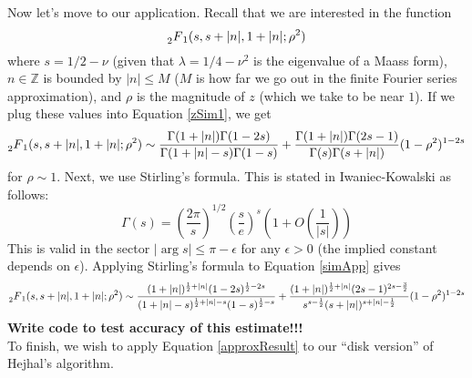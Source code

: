 \documentclass[]{article}
\begin{document}
Now let's move to our application.
Recall that we are interested in the function
$$
\prescript{}{2}{F}_1(s, s + |n|, 1 + |n|; \rho^2)
$$
where $s = 1/2 - \nu$ (given that $\lambda = 1/4 - \nu^2$ is the eigenvalue of a Maass form), $n \in \mathbb{Z}$ is bounded by $|n| \leq M$ ($M$ is how far we go out in the finite Fourier series approximation), and $\rho$ is the magnitude of $z$ (which we take to be near $1$).
If we plug these values into Equation \ref{zSim1}, we get
\begin{equation}\label{simApp}
\prescript{}{2}{F}_1(s, s + |n|, 1 + |n|; \rho^2) \sim
\frac{\Gamma(1 + |n|)\Gamma(1 - 2s)}{\Gamma(1 + |n| - s)\Gamma(1 - s)} +
\frac{\Gamma(1 + |n|)\Gamma(2s-1)}{\Gamma(s)\Gamma(s + |n|)}(1 - \rho^2)^{1 - 2s}
\end{equation}
for $\rho \sim 1$.
Next, we use Stirling's formula.
This is stated in Iwaniec-Kowalski as follows:
$$
\Gamma(s) = \left( \frac{2\pi}{s} \right)^{1/2}\left( \frac{s}{e} \right)^s\left( 1 + O\left( \frac{1}{|s|}\right) \right)
$$
This is valid in the sector $|\arg s| \leq \pi - \epsilon$ for any $\epsilon > 0$ (the implied constant depends on $\epsilon$).
Applying Stirling's formula to Equation \ref{simApp} gives
\begin{equation}\label{approxResult}
	\prescript{}{2}{F}_1(s, s + |n|, 1 + |n|; \rho^2) \sim
	\frac{(1+|n|)^{\frac{1}{2}+|n|}(1-2s)^{\frac{1}{2}-2s}}{(1+|n|-s)^{\frac{1}{2}+|n|-s}(1-s)^{\frac{1}{2}-s}} +
	\frac{(1+|n|)^{\frac{1}{2}+|n|}(2s-1)^{2s-\frac{3}{2}}}{s^{s-\frac{1}{2}}(s+|n|)^{s+|n|-\frac{1}{2}}}(1-\rho^2)^{1-2s}
\end{equation}
\textbf{Write code to test accuracy of this estimate!!!}
\\

To finish, we wish to apply Equation \ref{approxResult} to our ``disk version'' of Hejhal's algorithm.
\end{document}
